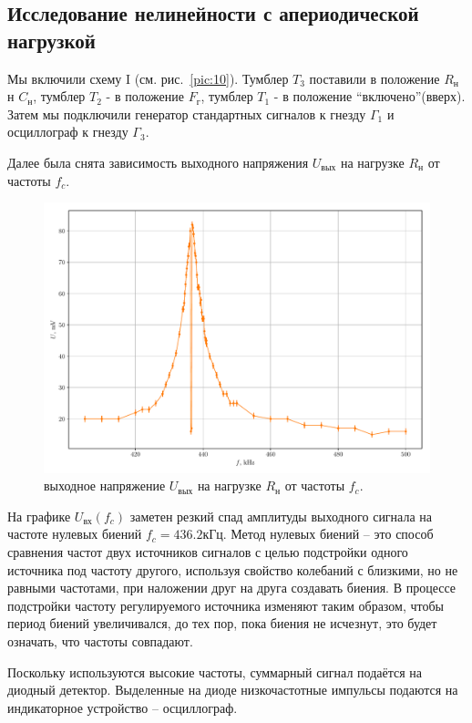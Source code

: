 \subsection{Исследование нелинейности с апериодической нагрузкой}
Мы включили схему I (см. рис.~\ref{pic:10}). Тумблер $T_3$ поставили в положение $R_{\text{н}}$ н $C_{\text{н}}$,
тумблер $T_2$ - в положение $F_{\text{г}}$, тумблер $T_1$ - в положение “включено”(вверх). Затем мы
подключили генератор стандартных сигналов к гнезду $\Gamma_1$ и осциллограф к гнезду $\Gamma_3$.

Далее была снята зависимость выходного напряжения $U_{\text{вых}}$ на нагрузке $R_{\text{н}}$ от частоты $f_c$. 
\begin{figure}[h!]
	\centering
	\includegraphics[width=\textwidth]{plots/exp1.pdf}
	\caption{выходное напряжение $U_{\text{вых}}$ на нагрузке $R_{\text{н}}$ от частоты $f_c$.}
	\label{exp:1}
\end{figure}

На графике $U_\text{вх}(f_c)$ заметен резкий спад амплитуды выходного сигнала на частоте нулевых биений $f_c=436.2\text{кГц}$. Метод нулевых биений -- это способ сравнения частот двух источников сигналов с целью подстройки одного источника под частоту другого, используя свойство колебаний с близкими, но не равными частотами, при наложении друг на друга создавать биения. В процессе подстройки частоту регулируемого источника изменяют таким образом, чтобы период биений увеличивался, до тех пор, пока биения не исчезнут, это будет означать, что частоты совпадают. 

Поскольку используются высокие частоты, суммарный сигнал подаётся на диодный детектор. Выделенные на диоде низкочастотные импульсы подаются на индикаторное устройство -- осциллограф.

